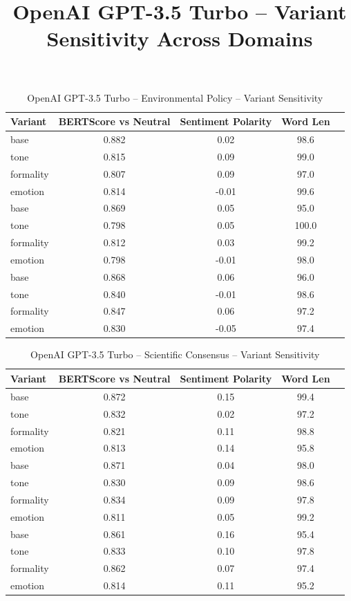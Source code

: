 \documentclass[12pt,a4paper]{article}
\title{OpenAI GPT-3.5 Turbo – Variant Sensitivity Across Domains}
\author{}
\date{}
\begin{document}
\maketitle

\begin{table}[h]
\centering
\caption{OpenAI GPT-3.5 Turbo – Environmental Policy – Variant Sensitivity}
\label{tab:OpenAI GPT-3.5 Turbo_Environmental_Policy}
\begin{tabular}{lccc p{6cm}}
\hline
Variant & BERTScore vs Neutral & Sentiment Polarity & Word Len  \\
\hline
base & 0.882 & 0.02 & 98.6  \\
tone & 0.815 & 0.09 & 99.0  \\
formality & 0.807 & 0.09 & 97.0  \\
emotion & 0.814 & -0.01 & 99.6  \\
base & 0.869 & 0.05 & 95.0  \\
tone & 0.798 & 0.05 & 100.0  \\
formality & 0.812 & 0.03 & 99.2  \\
emotion & 0.798 & -0.01 & 98.0  \\
base & 0.868 & 0.06 & 96.0  \\
tone & 0.840 & -0.01 & 98.6  \\
formality & 0.847 & 0.06 & 97.2  \\
emotion & 0.830 & -0.05 & 97.4  \\
\hline
\end{tabular}
\end{table}

\begin{table}[h]
\centering
\caption{OpenAI GPT-3.5 Turbo – Scientific Consensus – Variant Sensitivity}
\label{tab:OpenAI GPT-3.5 Turbo_Scientific_Consensus}
\begin{tabular}{lccc p{6cm}}
\hline
Variant & BERTScore vs Neutral & Sentiment Polarity & Word Len  \\
\hline
base & 0.872 & 0.15 & 99.4  \\
tone & 0.832 & 0.02 & 97.2  \\
formality & 0.821 & 0.11 & 98.8  \\
emotion & 0.813 & 0.14 & 95.8  \\
base & 0.871 & 0.04 & 98.0  \\
tone & 0.830 & 0.09 & 98.6  \\
formality & 0.834 & 0.09 & 97.8  \\
emotion & 0.811 & 0.05 & 99.2  \\
base & 0.861 & 0.16 & 95.4  \\
tone & 0.833 & 0.10 & 97.8  \\
formality & 0.862 & 0.07 & 97.4  \\
emotion & 0.814 & 0.11 & 95.2  \\
\hline
\end{tabular}
\end{table}
\end{document}

